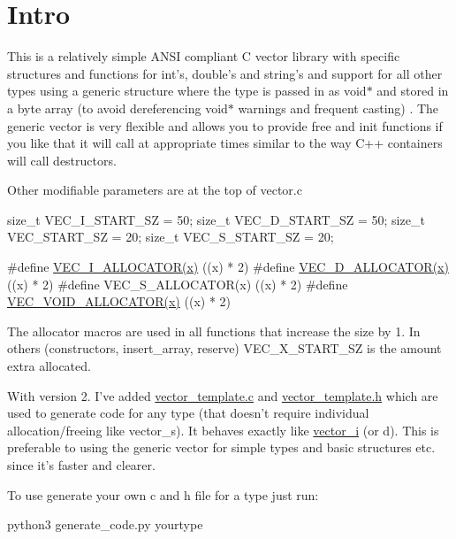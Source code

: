 \hypertarget{index_Intro}{}\section{Intro}\label{index_Intro}
This is a relatively simple A\-N\-S\-I compliant C vector library with specific structures and functions for int's, double's and string's and support for all other types using a generic structure where the type is passed in as void$\ast$ and stored in a byte array (to avoid dereferencing void$\ast$ warnings and frequent casting) . The generic vector is very flexible and allows you to provide free and init functions if you like that it will call at appropriate times similar to the way C++ containers will call destructors.

Other modifiable parameters are at the top of vector.\-c 
\begin{DoxyPre}
size\_t VEC\_I\_START\_SZ = 50;
size\_t VEC\_D\_START\_SZ = 50;
size\_t VEC\_START\_SZ = 20;
size\_t VEC\_S\_START\_SZ = 20;\end{DoxyPre}



\begin{DoxyPre}#define \hyperlink{vector__i_8c_a6d9a8fd1aaa4a8df09d79da016a5c5aa}{VEC\_I\_ALLOCATOR(x)} ((x) * 2)
#define \hyperlink{vector__d_8c_a024a194564bd2419ca1ac75e3cdec3e8}{VEC\_D\_ALLOCATOR(x)} ((x) * 2)
#define VEC\_S\_ALLOCATOR(x) ((x) * 2)
#define \hyperlink{vector__void_8c_a6f86fe931c02dfbb3d901d2f5e5ec969}{VEC\_VOID\_ALLOCATOR(x)} ((x) * 2)
\end{DoxyPre}
 The allocator macros are used in all functions that increase the size by 1. In others (constructors, insert\-\_\-array, reserve) V\-E\-C\-\_\-\-X\-\_\-\-S\-T\-A\-R\-T\-\_\-\-S\-Z is the amount extra allocated.

With version 2. I've added \hyperlink{vector__template_8c}{vector\-\_\-template.\-c} and \hyperlink{vector__template_8h}{vector\-\_\-template.\-h} which are used to generate code for any type (that doesn't require individual allocation/freeing like vector\-\_\-s). It behaves exactly like \hyperlink{structvector__i}{vector\-\_\-i} (or d). This is preferable to using the generic vector for simple types and basic structures etc. since it's faster and clearer.

To use generate your own c and h file for a type just run\-: 
\begin{DoxyPre}
python3 generate\_code.py yourtype
\end{DoxyPre}


